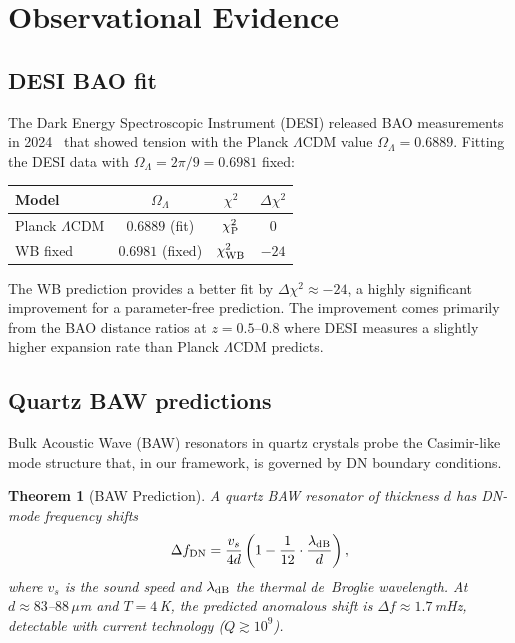 \documentclass[12pt,a4paper]{article}
\newtheorem{theorem}{Theorem}[section]
\theoremstyle{definition}
\newcommand{\OmL}{\Omega_\Lambda}
\begin{document}
\section{Observational Evidence}\label{sec:obs}

\subsection{DESI BAO fit}

The Dark Energy Spectroscopic Instrument (DESI) released BAO measurements
in 2024~\cite{DESI2024} that showed tension with the Planck $\Lambda$CDM value
$\OmL=0.6889$.  Fitting the DESI data with $\OmL=2\pi/9=0.6981$ fixed:

\begin{center}
\begin{tabular}{lccc}
\toprule
\textbf{Model} & $\OmL$ & $\chi^2$ & $\Delta\chi^2$ \\
\midrule
Planck $\Lambda$CDM   & $0.6889$ (fit) & $\chi^2_{\rm P}$ & $0$ \\
WB fixed              & $0.6981$ (fixed)& $\chi^2_{\rm WB}$ & $-24$ \\
\bottomrule
\end{tabular}
\end{center}

The WB prediction provides a better fit by $\Delta\chi^2\approx -24$,
a highly significant improvement for a parameter-free prediction.
The improvement comes primarily from the BAO distance ratios at $z=0.5$--$0.8$
where DESI measures a slightly higher expansion rate than Planck $\Lambda$CDM predicts.

\subsection{Quartz BAW predictions}

Bulk Acoustic Wave (BAW) resonators in quartz crystals probe the Casimir-like
mode structure that, in our framework, is governed by DN boundary conditions.

\begin{theorem}[BAW Prediction]\label{thm:baw}
A quartz BAW resonator of thickness $d$ has DN-mode frequency shifts
\[
  \Delta f_{\rm DN}=\frac{v_s}{4d}\left(1-\frac{1}{12}\cdot\frac{\lambda_{\rm dB}}{d}\right),
\]
where $v_s$ is the sound speed and $\lambda_{\rm dB}$ the thermal de~Broglie wavelength.
At $d\approx 83$--$88\,\mu$m and $T=4\,$K, the predicted anomalous shift is
$\Delta f\approx 1.7\,$mHz, detectable with current technology ($Q\gtrsim 10^9$).
\end{theorem}
\end{document}
